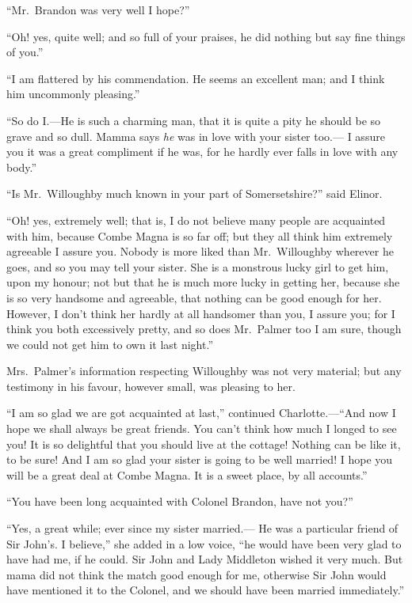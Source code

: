 \documentclass{article}
\begin{document}
``Mr.\ Brandon was very well I hope?''

``Oh! yes, quite well; and so full of your praises,
he did nothing but say fine things of you.''

``I am flattered by his commendation.  He seems
an excellent man; and I think him uncommonly pleasing.''

``So do I.---He is such a charming man, that it
is quite a pity he should be so grave and so dull.
Mamma says \emph{he} was in love with your sister too.---%
I assure you it was a great compliment if he was, for he
hardly ever falls in love with any body.''

``Is Mr.\ Willoughby much known in your part
of Somersetshire?'' said Elinor.

``Oh! yes, extremely well; that is, I do not believe
many people are acquainted with him, because Combe Magna
is so far off; but they all think him extremely agreeable
I assure you.  Nobody is more liked than Mr.\ Willoughby
wherever he goes, and so you may tell your sister.
She is a monstrous lucky girl to get him, upon my honour;
not but that he is much more lucky in getting her,
because she is so very handsome and agreeable, that nothing
can be good enough for her.  However, I don't think
her hardly at all handsomer than you, I assure you;
for I think you both excessively pretty, and so does
Mr.\ Palmer too I am sure, though we could not get him
to own it last night.''

Mrs.\ Palmer's information respecting Willoughby
was not very material; but any testimony in his favour,
however small, was pleasing to her.

``I am so glad we are got acquainted at last,''
continued Charlotte.---``And now I hope we shall always be
great friends.  You can't think how much I longed to see you!
It is so delightful that you should live at the cottage!
Nothing can be like it, to be sure!  And I am so glad
your sister is going to be well married!  I hope you will
be a great deal at Combe Magna.  It is a sweet place,
by all accounts.''

``You have been long acquainted with Colonel Brandon,
have not you?''

``Yes, a great while; ever since my sister married.---%
He was a particular friend of Sir John's. I believe,''
she added in a low voice, ``he would have been very
glad to have had me, if he could.  Sir John and Lady
Middleton wished it very much.  But mama did not think
the match good enough for me, otherwise Sir John would
have mentioned it to the Colonel, and we should have been
married immediately.''
\end{document}
